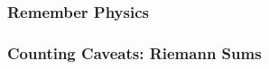 \begin{frame}
    \frametitle{Remember Physics}
\end{frame}

\begin{frame}
    \frametitle{Counting Caveats: Riemann Sums}
\end{frame}










